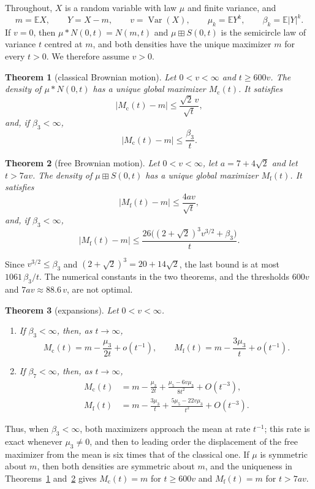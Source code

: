 \documentclass[11pt]{amsart}
\newtheorem{theorem}{Theorem}
\theoremstyle{definition}
\newcommand{\E}{\mathbb{E}}
\newcommand{\Mcl}{M_{\mathrm{c}}}
\newcommand{\Mfr}{M_{\mathrm{f}}}
\newcommand{\Var}{\operatorname{Var}}
\begin{document}
Throughout, $X$ is a random variable with law $\mu$ and finite variance, and
\[
m=\E X,\qquad Y=X-m,\qquad v=\Var(X),\qquad \mu_k=\E Y^k,\qquad \beta_k=\E|Y|^k .
\]
If $v=0$, then $\mu*N(0,t)=N(m,t)$ and $\mu\boxplus S(0,t)$ is the semicircle law of variance $t$ centred at $m$, and
both densities have the unique maximizer $m$ for every $t>0$. We therefore assume $v>0$.

\begin{theorem}[classical Brownian motion]\label{thm:classical}
Let $0<v<\infty$ and $t\ge 600v$. The density of $\mu*N(0,t)$ has a unique global maximizer $\Mcl(t)$. It satisfies
\[
|\Mcl(t)-m|\le \frac{\sqrt2\,v}{\sqrt t},
\]
and, if $\beta_3<\infty$,
\[
|\Mcl(t)-m|\le\frac{\beta_3}{t}.
\]
\end{theorem}

\begin{theorem}[free Brownian motion]\label{thm:free}
Let $0<v<\infty$, let $a=7+4\sqrt2$ and let $t>7av$. The density of $\mu\boxplus S(0,t)$ has a unique global
maximizer $\Mfr(t)$. It satisfies
\[
|\Mfr(t)-m|\le \frac{4av}{\sqrt t},
\]
and, if $\beta_3<\infty$,
\[
|\Mfr(t)-m|\le\frac{26\bigl((2+\sqrt2)^3v^{3/2}+\beta_3\bigr)}{t}.
\]
\end{theorem}

Since $v^{3/2}\le\beta_3$ and $(2+\sqrt2)^3=20+14\sqrt2$, the last bound is at most $1061\,\beta_3/t$. The numerical
constants in the two theorems, and the thresholds $600v$ and $7av\approx 88.6\,v$, are not optimal.

\begin{theorem}[expansions]\label{thm:expansion}
Let $0<v<\infty$.
\begin{enumerate}
\item[(a)] If $\beta_3<\infty$, then, as $t\to\infty$,
\[
\Mcl(t)=m-\frac{\mu_3}{2t}+o(t^{-1}),\qquad \Mfr(t)=m-\frac{3\mu_3}{t}+o(t^{-1}).
\]
\item[(b)] If $\beta_7<\infty$, then, as $t\to\infty$,
\begin{align}
\Mcl(t)&=m-\frac{\mu_3}{2t}+\frac{\mu_5-6v\mu_3}{8t^2}+O(t^{-3}),\label{eq:exp-c}\\
\Mfr(t)&=m-\frac{3\mu_3}{t}+\frac{5\mu_5-22v\mu_3}{t^2}+O(t^{-3}).\label{eq:exp-f}
\end{align}
\end{enumerate}
\end{theorem}

Thus, when $\beta_3<\infty$, both maximizers approach the mean at rate $t^{-1}$; this rate is exact whenever
$\mu_3\ne0$, and then to leading order the displacement of the free maximizer from the mean is six times that of
the classical one. If $\mu$ is
symmetric about $m$, then both densities are symmetric about $m$, and the uniqueness in
Theorems~\ref{thm:classical} and~\ref{thm:free} gives $\Mcl(t)=m$ for $t\ge600v$ and $\Mfr(t)=m$ for $t>7av$.
\end{document}
